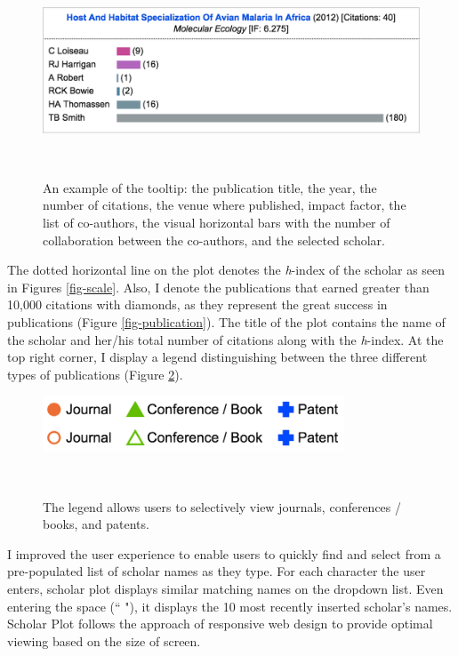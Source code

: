\begin{figure}[H]
\centering
  \includegraphics[width=1\textwidth]{figures/fig_tooltip}
  \caption{An example of the tooltip: the publication title, the year, the number of citations, the venue where published, impact factor, the list of co-authors, the visual horizontal bars with the number of collaboration between the co-authors, and the selected scholar.}~\label{fig-tooltip}
\end{figure}

The dotted horizontal line on the plot denotes the {\it h}-index of the scholar as seen in Figures \ref{fig-scale}. Also, I denote the publications that earned greater than 10,000 citations with diamonds, as they represent the great success in publications (Figure \ref{fig-publication}). The title of the plot contains the name of the scholar and her/his total number of citations along with the {\it h}-index. At the top right corner, I display a legend distinguishing between the three different types of publications (Figure \ref{fig-legend}).

\begin{figure}[!htb]
\centering
  \includegraphics[width=0.8\textwidth]{figures/fig_legend-toggle}
  \caption{The legend allows users to selectively view journals, conferences / books, and patents.}~\label{fig-legend}
\end{figure}



I improved the user experience to enable users to quickly find and select from a pre-populated list of scholar names as they type. For each character the user enters, scholar plot displays similar matching names on the dropdown list. Even entering the space (`` "), it displays the 10 most recently inserted scholar's names. Scholar Plot follows the approach of responsive web design to provide optimal viewing based on the size of screen.



